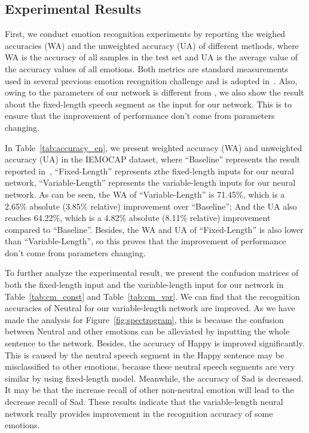 \documentclass[a4paper]{article}
\begin{document}
\subsection{Experimental Results}
\label{ssec:experimental results}
First, we conduct emotion recognition experiments by reporting the weighed accuracies (WA) and the unweighted accuracy (UA) of different methods, where WA is the accuracy of all samples in the test set and UA is the average value of the accuracy values of all emotions. Both metrics are standard measurements used in several previous emotion recognition challenge and is adopted in~\cite{satt2017}. Also, owing to the parameters of our network is different from \cite{satt2017}, we also show the result about the fixed-length speech segment as the input for our network. This is to ensure that the improvement of performance don't come from parameters changing.

In Table~\ref{tab:accuracy_en}, we present weighted accuracy (WA) and unweighted accuracy (UA) in the IEMOCAP dataset, where ``Baseline'' represents the result reported in~\cite{satt2017}, ``Fixed-Length'' represents zthe fixed-length inputs for our neural network, ``Variable-Length'' represents the variable-length inputs for our neural network. As can be seen, the WA of ``Variable-Length'' is 71.45\%, which is a 2.65\% absolute (3.85\% relative) improvement over ``Baseline''; And the UA also reaches 64.22\%, which is a 4.82\% absolute (8.11\% relative) improvement compared to ``Baseline''. Besides, the WA and UA of ``Fixed-Length'' is also lower than ``Variable-Length'', so this proves that the improvement of performance don't come from parameters changing.

To further analyze the experimental result, we present the confusion matrices of both the fixed-length input and the variable-length input for our network in Table~\ref{tab:cm_const} and Table~\ref{tab:cm_var}. We can find that the recognition accuracies of Neutral for our variable-length network are improved. As we have made the analysis for Figure~\ref{fig:spectrogram}, this is because the confusion between Neutral and other emotions can be alleviated by inputting the whole sentence to the network. Besides, the accuracy of Happy is improved significantly. This is caused by the neutral speech segment in the Happy sentence may be misclassified to other emotions, because these neutral speech segments are very similar by using fixed-length model. Meanwhile, the accuracy of Sad is decreased. It may be that the increase recall of other non-neutral emotion will lead to the decrease recall of Sad. These results indicate that the variable-length neural network really provides improvement in the recognition accuracy of some emotions.
\end{document}
